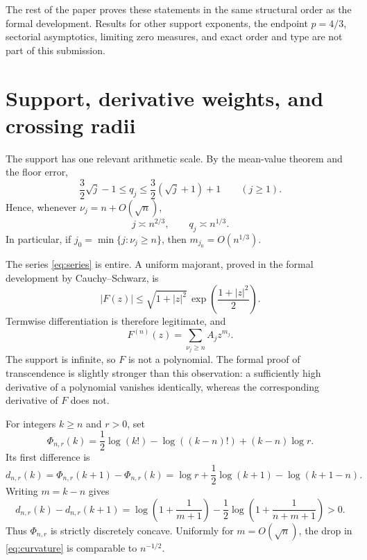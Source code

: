 \documentclass[11pt,reqno]{amsart}
\numberwithin{equation}{section}
\theoremstyle{remark}
\begin{document}
The rest of the paper proves these statements in the same structural order as the formal development.  Results for other support exponents, the endpoint $p=4/3$, sectorial asymptotics, limiting zero measures, and exact order and type are not part of this submission.

\section{Support, derivative weights, and crossing radii}\label{sec:weights}

The support has one relevant arithmetic scale.  By the mean-value theorem and the floor error,
\begin{equation}\label{eq:gap}
 \frac32\sqrt j-1\le q_j\le \frac32(\sqrt j+1)+1\qquad(j\ge1).
\end{equation}
Hence, whenever $\nu_j=n+O(\sqrt n)$,
\begin{equation}\label{eq:qscale}
 j\asymp n^{2/3},\qquad q_j\asymp n^{1/3}.
\end{equation}
In particular, if $j_0=\min\{j:\nu_j\ge n\}$, then $m_{j_0}=O(n^{1/3})$.

The series \eqref{eq:series} is entire.  A uniform majorant, proved in the formal development by Cauchy--Schwarz, is
\begin{equation}\label{eq:growthupper}
 |F(z)|\le \sqrt{1+|z|^2}\,\exp\!\left(\frac{1+|z|^2}{2}\right).
\end{equation}
Termwise differentiation is therefore legitimate, and
\begin{equation}\label{eq:derivative}
 F^{(n)}(z)=\sum_{\nu_j\ge n} A_jz^{m_j}.
\end{equation}
The support is infinite, so $F$ is not a polynomial.  The formal proof of transcendence is slightly stronger than this observation: a sufficiently high derivative of a polynomial vanishes identically, whereas the corresponding derivative of $F$ does not.

For integers $k\ge n$ and $r>0$, set
\begin{equation}\label{eq:Phi}
 \Phi_{n,r}(k)=\frac12\log(k!)-\log((k-n)!)+(k-n)\log r.
\end{equation}
Its first difference is
\begin{equation}\label{eq:difference}
 d_{n,r}(k)=\Phi_{n,r}(k+1)-\Phi_{n,r}(k)
 =\log r+\frac12\log(k+1)-\log(k+1-n).
\end{equation}
Writing $m=k-n$ gives
\begin{equation}\label{eq:curvature}
 d_{n,r}(k)-d_{n,r}(k+1)
 =\log\!\left(1+\frac1{m+1}\right)
 -\frac12\log\!\left(1+\frac1{n+m+1}\right)>0.
\end{equation}
Thus $\Phi_{n,r}$ is strictly discretely concave.  Uniformly for $m=O(\sqrt n)$, the drop in \eqref{eq:curvature} is comparable to $n^{-1/2}$.
\end{document}
